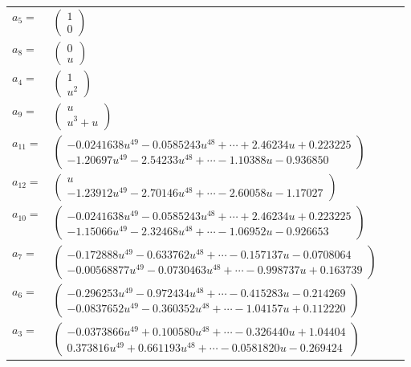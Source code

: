 \documentclass[1p]{elsarticle_modified}
\theoremstyle{definition}
\begin{document}
\begin{tabular}{m{7pt} m{180pt} m{7pt} m{180pt} }
\flushright $a_{5}=$&$\begin{pmatrix}1\\0\end{pmatrix}$ \\
\flushright $a_{8}=$&$\begin{pmatrix}0\\u\end{pmatrix}$ \\
\flushright $a_{4}=$&$\begin{pmatrix}1\\u^2\end{pmatrix}$ \\
\flushright $a_{9}=$&$\begin{pmatrix}u\\u^3+u\end{pmatrix}$ \\
\flushright $a_{11}=$&$\begin{pmatrix}-0.0241638 u^{49}-0.0585243 u^{48}+\cdots+2.46234 u+0.223225\\-1.20697 u^{49}-2.54233 u^{48}+\cdots-1.10388 u-0.936850\end{pmatrix}$ \\
\flushright $a_{12}=$&$\begin{pmatrix}u\\-1.23912 u^{49}-2.70146 u^{48}+\cdots-2.60058 u-1.17027\end{pmatrix}$ \\
\flushright $a_{10}=$&$\begin{pmatrix}-0.0241638 u^{49}-0.0585243 u^{48}+\cdots+2.46234 u+0.223225\\-1.15066 u^{49}-2.32468 u^{48}+\cdots-1.06952 u-0.926653\end{pmatrix}$ \\
\flushright $a_{7}=$&$\begin{pmatrix}-0.172888 u^{49}-0.633762 u^{48}+\cdots-0.157137 u-0.0708064\\-0.00568877 u^{49}-0.0730463 u^{48}+\cdots-0.998737 u+0.163739\end{pmatrix}$ \\
\flushright $a_{6}=$&$\begin{pmatrix}-0.296253 u^{49}-0.972434 u^{48}+\cdots-0.415283 u-0.214269\\-0.0837652 u^{49}-0.360352 u^{48}+\cdots-1.04157 u+0.112220\end{pmatrix}$ \\
\flushright $a_{3}=$&$\begin{pmatrix}-0.0373866 u^{49}+0.100580 u^{48}+\cdots-0.326440 u+1.04404\\0.373816 u^{49}+0.661193 u^{48}+\cdots-0.0581820 u-0.269424\end{pmatrix}$ \\

\end{tabular}
\end{document}
